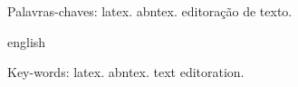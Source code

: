 
\begin{resumo}

\lipsum[1-1]

    
 \noindent
 Palavras-chaves: latex. abntex. editoração de texto.
\end{resumo}

\begin{resumo}[Abstract]
 	\begin{otherlanguage*}{english}
	\textit{
	\lipsum[1-1]
	} 
 
    \noindent 
    Key-words: latex. abntex. text editoration.	
 	\end{otherlanguage*}
\end{resumo}